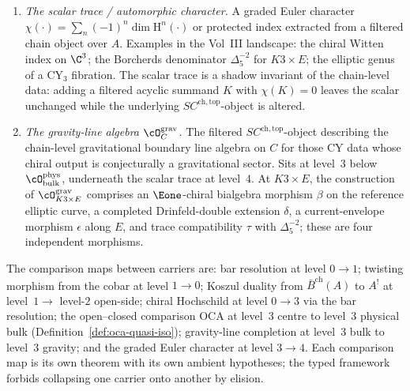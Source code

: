 \begin{remark}
\begin{enumerate}[label=\textup{(C\arabic*)}]
 \item \emph{The scalar trace / automorphic character.} A graded Euler character $\chi(\cdot) = \sum_n (-1)^n \dim \mathrm{H}^n(\cdot)$ or protected index extracted from a filtered chain object over $A$. Examples in the Vol~III landscape: the chiral Witten index on $\C^3$; the Borcherds denominator $\Delta_5^{-2}$ for $K3 \times E$; the elliptic genus of a CY$_3$ fibration. The scalar trace is a shadow invariant of the chain-level data: adding a filtered acyclic summand $K$ with $\chi(K) = 0$ leaves the scalar unchanged while the underlying $SC^{\mathrm{ch}, \mathrm{top}}$-object is altered.
 \item \emph{The gravity-line algebra $\cO^{\mathrm{grav}}_C$.} The filtered $SC^{\mathrm{ch}, \mathrm{top}}$-object describing the chain-level gravitational boundary line algebra on $C$ for those CY data whose chiral output is conjecturally a gravitational sector. Sits at level~$3$ below $\cO^{\mathrm{phys}}_{\mathrm{bulk}}$, underneath the scalar trace at level~$4$. At $K3 \times E$, the construction of $\cO^{\mathrm{grav}}_{K3 \times E}$ comprises an $\Eone$-chiral bialgebra morphism $\beta$ on the reference elliptic curve, a completed Drinfeld-double extension $\delta$, a current-envelope morphism $\epsilon$ along $E$, and trace compatibility $\tau$ with $\Delta_5^{-2}$; these are four independent morphisms.
\end{enumerate}
The comparison maps between carriers are: bar resolution at level $0 \to 1$; twisting morphism from the cobar at level $1 \to 0$; Koszul duality from $\bar B^{\mathrm{ch}}(A)$ to $A^!$ at level~$1 \to$ level-$2$ open-side; chiral Hochschild at level $0 \to 3$ via the bar resolution; the open--closed comparison $\mathrm{OCA}$ at level~$3$ centre to level~$3$ physical bulk \textup{(}Definition~\ref{def:oca-quasi-iso}\textup{);} gravity-line completion at level~$3$ bulk to level~$3$ gravity; and the graded Euler character at level $3 \to 4$. Each comparison map is its own theorem with its own ambient hypotheses; the typed framework forbids collapsing one carrier onto another by elision.
\end{remark}

